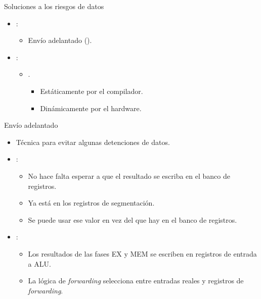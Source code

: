 \begin{frame}[t]{Soluciones a los riesgos de datos}
\begin{itemize}
  \item {}:
    \begin{itemize}
      \item Envío adelantado ().
    \end{itemize}

  \item {}:
    \begin{itemize}
      \item {}.
        \begin{itemize}
          \item Estáticamente por el compilador.
          \item Dinámicamente por el hardware.
        \end{itemize}
    \end{itemize}  
\end{itemize}
 \end{frame}

\begin{frame}[t]{Envío adelantado}
\begin{itemize}
  \item Técnica para evitar algunas detenciones de datos.
  \item {}:
    \begin{itemize}
      \item No hace falta esperar a que el resultado se escriba en el banco de registros. 
      \item Ya está en los registros de segmentación.
      \item Se puede usar ese valor en vez del que hay en el banco de registros.
    \end{itemize}
  \item {}:
    \begin{itemize}
      \item Los resultados de las fases EX y MEM se escriben en registros de entrada a ALU.
      \item La lógica de \emph{forwarding} selecciona entre entradas reales y registros de \emph{forwarding}.
    \end{itemize}
\end{itemize}
\end{frame}

